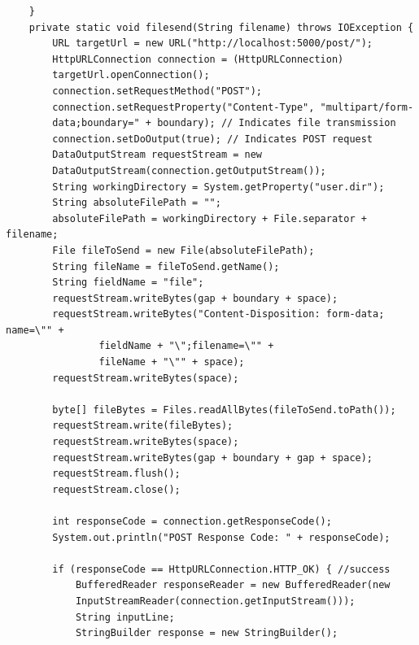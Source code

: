 \documentclass[11pt]{article}
\begin{document}
\begin{verbatim}
    }
    private static void filesend(String filename) throws IOException {
        URL targetUrl = new URL("http://localhost:5000/post/");
        HttpURLConnection connection = (HttpURLConnection)
        targetUrl.openConnection();
        connection.setRequestMethod("POST");
        connection.setRequestProperty("Content-Type", "multipart/form-
        data;boundary=" + boundary); // Indicates file transmission
        connection.setDoOutput(true); // Indicates POST request
        DataOutputStream requestStream = new 
        DataOutputStream(connection.getOutputStream());
        String workingDirectory = System.getProperty("user.dir");
        String absoluteFilePath = "";
        absoluteFilePath = workingDirectory + File.separator + filename;
        File fileToSend = new File(absoluteFilePath);
        String fileName = fileToSend.getName();
        String fieldName = "file";
        requestStream.writeBytes(gap + boundary + space);
        requestStream.writeBytes("Content-Disposition: form-data; name=\"" +
                fieldName + "\";filename=\"" +
                fileName + "\"" + space);
        requestStream.writeBytes(space);

        byte[] fileBytes = Files.readAllBytes(fileToSend.toPath());
        requestStream.write(fileBytes);
        requestStream.writeBytes(space);
        requestStream.writeBytes(gap + boundary + gap + space);
        requestStream.flush();
        requestStream.close();

        int responseCode = connection.getResponseCode();
        System.out.println("POST Response Code: " + responseCode);

        if (responseCode == HttpURLConnection.HTTP_OK) { //success
            BufferedReader responseReader = new BufferedReader(new 
            InputStreamReader(connection.getInputStream()));
            String inputLine;
            StringBuilder response = new StringBuilder();


\end{verbatim}
\end{document}
